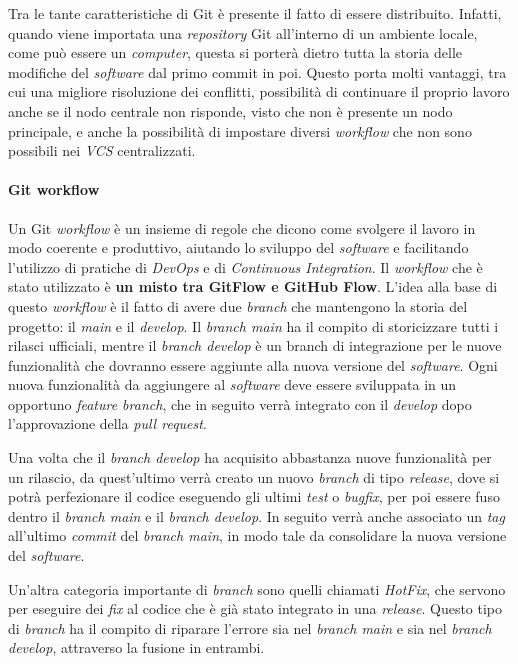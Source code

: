 Tra le tante caratteristiche di Git è presente il fatto di essere distribuito. Infatti, quando viene importata una \textit{repository} Git all'interno di un ambiente locale, come può essere un \textit{computer}, questa si porterà dietro tutta la storia delle modifiche del \textit{software} dal primo commit in poi. Questo porta molti vantaggi, tra cui una migliore risoluzione dei conflitti, possibilità di continuare il proprio lavoro anche se il nodo centrale non risponde, visto che non è presente un nodo principale, e anche la possibilità di impostare diversi \textit{workflow} che non sono possibili nei \textit{VCS} centralizzati. 

\paragraph{Git workflow}
Un Git \textit{workflow} è un insieme di regole che dicono come svolgere il lavoro in modo coerente e produttivo,  aiutando lo sviluppo del \textit{software} e facilitando l'utilizzo di pratiche di \textit{DevOps} e di \textit{Continuous Integration}. Il \textit{workflow} che è stato utilizzato è \textbf{un misto tra GitFlow e GitHub Flow}.
L'idea alla base di questo \textit{workflow} è il fatto di avere due \textit{branch} che mantengono la storia del progetto: il \textit{main} e il \textit{develop}. Il \textit{branch main} ha il compito di storicizzare tutti i rilasci ufficiali, mentre il \textit{branch develop} è un branch di integrazione per le nuove funzionalità che dovranno essere aggiunte alla nuova versione del \textit{software}. Ogni nuova funzionalità da aggiungere al \textit{software} deve essere sviluppata in un opportuno \textit{feature branch}, che in seguito verrà integrato con il \textit{develop} dopo l'approvazione della \textit{pull request}.

Una volta che il \textit{branch develop} ha acquisito abbastanza nuove funzionalità per un rilascio, da quest'ultimo verrà creato un nuovo \textit{branch} di tipo \textit{release}, dove si potrà perfezionare il codice eseguendo gli ultimi \textit{test} o \textit{bugfix}, per poi essere fuso dentro il \textit{branch main} e il \textit{branch develop}. In seguito verrà anche associato un \textit{tag} all'ultimo \textit{commit} del \textit{branch main}, in modo tale da consolidare la nuova versione del \textit{software}.

Un'altra categoria importante di \textit{branch} sono quelli chiamati \textit{HotFix}, che servono per eseguire dei \textit{fix} al codice che è già stato integrato in una \textit{release}. Questo tipo di \textit{branch} ha il compito di riparare l'errore sia nel \textit{branch main} e sia nel \textit{branch develop}, attraverso la fusione in entrambi. \\

